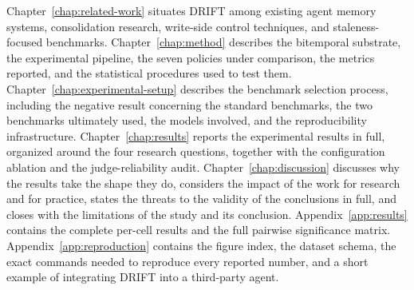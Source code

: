 Chapter~\ref{chap:related-work} situates DRIFT among existing agent memory systems, consolidation research, write-side control techniques, and staleness-focused benchmarks. Chapter~\ref{chap:method} describes the bitemporal substrate, the experimental pipeline, the seven policies under comparison, the metrics reported, and the statistical procedures used to test them. Chapter~\ref{chap:experimental-setup} describes the benchmark selection process, including the negative result concerning the standard benchmarks, the two benchmarks ultimately used, the models involved, and the reproducibility infrastructure. Chapter~\ref{chap:results} reports the experimental results in full, organized around the four research questions, together with the configuration ablation and the judge-reliability audit. Chapter~\ref{chap:discussion} discusses why the results take the shape they do, considers the impact of the work for research and for practice, states the threats to the validity of the conclusions in full, and closes with the limitations of the study and its conclusion. Appendix~\ref{app:results} contains the complete per-cell results and the full pairwise significance matrix. Appendix~\ref{app:reproduction} contains the figure index, the dataset schema, the exact commands needed to reproduce every reported number, and a short example of integrating DRIFT into a third-party agent.

